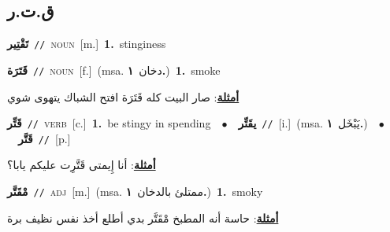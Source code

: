 \documentclass[10pt,a4paper,twoside]{article} %
\begin{document}
\begin{multicols}{2}
{{{{{{{{{{{{{\vspace{-3mm}
\subsection*{\color{blue}\foreignlanguage{arabic}{ق.ت.ر}\color{blue}{}} 

{\setlength\topsep{0pt}\textbf{\foreignlanguage{arabic}{تَقْتِير}}\ {\color{gray}\texttt{//}\color{black}}\ \textsc{noun}\ [m.]\ \textbf{1.}~stinginess\ 

{\setlength\topsep{0pt}\textbf{\foreignlanguage{arabic}{قَتَرَة}}\ {\color{gray}\texttt{//}\color{black}}\ \textsc{noun}\ [f.]\ \color{gray}(msa. \foreignlanguage{arabic}{دخان}~\foreignlanguage{arabic}{\textbf{١.}})\color{black}\ \textbf{1.}~smoke\  \begin{flushright}\color{gray}\foreignlanguage{arabic}{\textbf{\underline{\foreignlanguage{arabic}{أمثلة}}}: صار البيت كله قَتَرَة افتح الشباك يتهوى شوي}\end{flushright}\color{black}} \vspace{2mm}

{\setlength\topsep{0pt}\textbf{\foreignlanguage{arabic}{قَتِّر}}\ {\color{gray}\texttt{//}\color{black}}\ \textsc{verb}\ [c.]\ \textbf{1.}~be stingy in spending\ \ $\bullet$\ \ \setlength\topsep{0pt}\textbf{\foreignlanguage{arabic}{يقَتِّر}}\ {\color{gray}\texttt{//}\color{black}}\ [i.]\ \color{gray}(msa. \foreignlanguage{arabic}{يَبْخَل}~\foreignlanguage{arabic}{\textbf{١.}})\color{black}\ \ $\bullet$\ \ \setlength\topsep{0pt}\textbf{\foreignlanguage{arabic}{قَتَّر}}\ {\color{gray}\texttt{//}\color{black}}\ [p.]\  \begin{flushright}\color{gray}\foreignlanguage{arabic}{\textbf{\underline{\foreignlanguage{arabic}{أمثلة}}}: أنا إِيمتى قَتَّرِت عليكم يابا؟}\end{flushright}\color{black}} \vspace{2mm}

{\setlength\topsep{0pt}\textbf{\foreignlanguage{arabic}{مْقَتَّر}}\ {\color{gray}\texttt{//}\color{black}}\ \textsc{adj}\ [m.]\ \color{gray}(msa. \foreignlanguage{arabic}{ممتلئ بالدخان}~\foreignlanguage{arabic}{\textbf{١.}})\color{black}\ \textbf{1.}~smoky\  \begin{flushright}\color{gray}\foreignlanguage{arabic}{\textbf{\underline{\foreignlanguage{arabic}{أمثلة}}}: حاسة أنه المطبخ مْقَتَّر بدي أطلع أخذ نفس نظيف برة}\end{flushright}\color{black}} \vspace{2mm}

}}}}}}}}}}}}}}
\end{multicols}
\end{document}
